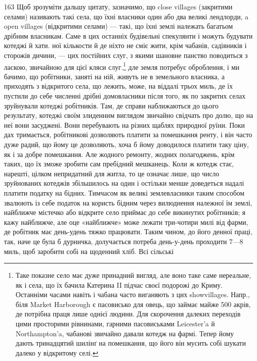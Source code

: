 163 Щоб зрозуміти дальшу цитату, зазначимо, що close villages (закритими
селами) називають такі села, що їхні власники один
або два великі лендлорди, a open villages (відкритими селами) — такі,
що їхні землі належать багатьом дрібним власникам. Саме в цих останніх
будівельні спекулянти і можуть будувати котеджі й хати.
ної кількости й де ніхто не сміє жити, крім чабанів, садівників
і сторожів дичини, — цих постійних слуг, з якими шановне панство
поводиться з ласкою, звичайною для цієї кляси слуг.\footnote{
Таке показне село має дуже принадний вигляд, але воно таке
саме нереальне, як і села, що їх бачила Катерина II підчас своєї подорожі
до Криму. Останніми часами навіть і чабана часто виганяють з цих showvillages.
Напр., біля Market Harborough є пасовисько для овець, що
займає майже 500 акрів, де потрібна праця лише однієї людини. Для скорочення
далеких переходів цими просторими рівнинами, гарними пасовиськами
Leicester’a й Northampton’a, чабанові звичайно давали котедж
на фармі. Тепер йому дають тринадцятий шилінґ на помешкання, що його
він мусить собі шукати далеко у відкритому селі.
}
дле земля потребує оброблення, і ми бачимо, що робітники,
заняті на ній, живуть не в земельного власника, а приходять з
відкритого села, що лежить, може, на віддалі трьох миль, де
їх пустили до себе численні дрібні домовласники після того, як
по закритих селах зруйнували котеджі робітників. Там, де справи
наближаються до цього результату, котеджі своїм злиденним
виглядом звичайно свідчать про долю, що на неї вони засуджені.
Вони перебувають на різних щаблях природної руїни. Поки
дах тримається, робітникові дозволяють платити за помешкання
ренту, і він часто дуже радий, що йому це дозволяють, хоча б
йому доводилося платити таку ціну, як і за добре помешкання.
Але жодного ремонту, жодних полагоджень, крім таких, що їх
зможе зробити сам пребідний мешканець. Коли ж котедж стає,
нарешті, цілком непридатний для житла, то це означає лише,
що число зруйнованих котеджів збільшилось на один і остільки
менше доведеться надалі платити податку на бідних. Тимчасом
як великі землевласники таким способом звалюють із себе податок
на користь бідним через вилюднення належної їм землі, найближче
містечко або відкрите село приймає до себе викинутих
робітників; я кажу найближче, але оце «найближче» може лежати
три-чотири милі від фарми, де робітник має день-удень
тяжко працювати. Таким чином, до його денної праці, так, наче
це була б дурничка, долучається потреба день-у-день проходити
7—8 миль, щоб заробити собі на щоденний хліб. Всі сільські
